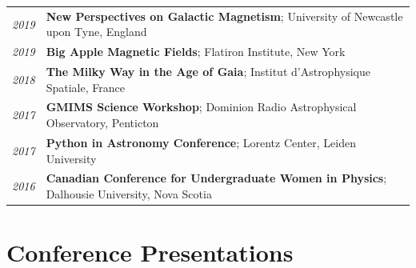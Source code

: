 \documentclass[10pt]{res} %
\begin{document}
\begin{resume}
\begin{table}[h!]
\begin{tabularx}{\textwidth}{lX}
 \textit{2019} & \textbf{New Perspectives on Galactic Magnetism}; University of Newcastle upon Tyne, England \\
 \textit{2019} & \textbf{Big Apple Magnetic Fields}; Flatiron Institute, New York \\
\textit{2018} & \textbf{The Milky Way in the Age of Gaia}; Institut d'Astrophysique Spatiale, France \\
\textit{2017} & \textbf{GMIMS Science Workshop}; Dominion Radio Astrophysical Observatory, Penticton \\
\textit{2017} & \textbf{Python in Astronomy Conference}; Lorentz Center, Leiden University \\
\textit{2016} & \textbf{Canadian Conference for Undergraduate Women in Physics}; Dalhousie University, Nova Scotia
\end{tabularx}
\end{table}


\section{\Large Conference Presentations}
\vspace{-5pt} %
\noindent\makebox[\linewidth]{\rule{\textwidth}{0.4pt}}
\vspace{-20pt} %


\end{resume}
\end{document}
